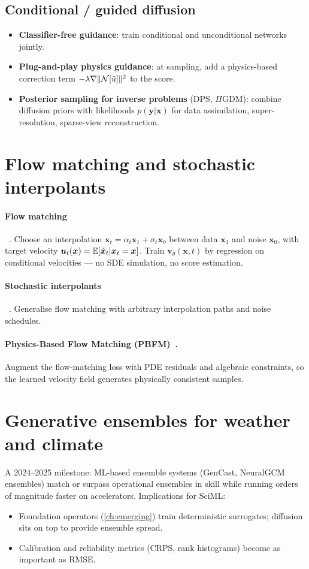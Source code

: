 \subsection{Conditional / guided diffusion}
\begin{itemize}
\item \textbf{Classifier-free guidance}: train conditional and
unconditional networks jointly.
\item \textbf{Plug-and-play physics guidance}: at sampling, add a
physics-based correction term $-\lambda \nabla \|\mathcal{N}[\hat u]\|^2$ to
the score.
\item \textbf{Posterior sampling for inverse problems} (DPS, $\Pi$GDM):
combine diffusion priors with likelihoods $p(\bm{y}|\bm{x})$ for
data assimilation, super-resolution, sparse-view reconstruction.
\end{itemize}

\section{Flow matching and stochastic interpolants}
\paragraph{Flow matching}~\cite{lipman2023flowmatching}.
Choose an interpolation $\bm{x}_t = \alpha_t\bm{x}_1 + \sigma_t\bm{x}_0$
between data $\bm{x}_1$ and noise $\bm{x}_0$, with target velocity
$\bm{u}_t(\bm{x})=\operatorname{\mathbb{E}}[\dot{\bm{x}}_t|\bm{x}_t=\bm{x}]$. Train
$\bm{v}_\theta(\bm{x},t)$ by regression on conditional velocities ---
no SDE simulation, no score estimation.
\paragraph{Stochastic interpolants}~\cite{albergo2023interpolants}.
Generalise flow matching with arbitrary interpolation paths and noise
schedules.
\paragraph{Physics-Based Flow Matching (PBFM)~\cite{pbfm2025}.}
Augment the flow-matching loss with PDE residuals and algebraic
constraints, so the learned velocity field generates physically
consistent samples.

\section{Generative ensembles for weather and climate}
A 2024--2025 milestone: ML-based ensemble systems (GenCast, NeuralGCM
ensembles) match or surpass operational ensembles in skill while
running orders of magnitude faster on accelerators. Implications for
SciML:
\begin{itemize}
\item Foundation operators (\cref{ch:emerging}) train deterministic
surrogates; diffusion sits on top to provide ensemble spread.
\item Calibration and reliability metrics (CRPS, rank histograms)
become as important as RMSE.
\end{itemize}

